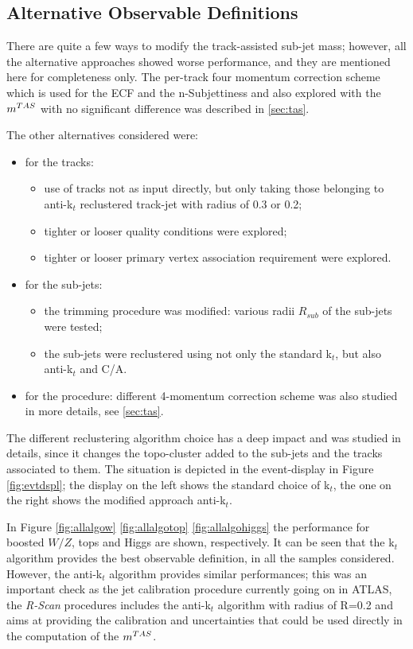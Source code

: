 \subsection{Alternative Observable Definitions}
\label{sec:alternate}

There are quite a few ways to modify the track-assisted sub-jet mass; however, all the alternative approaches showed worse performance, and they are mentioned here for completeness only.
The per-track four momentum correction scheme which is used for the ECF and the n-Subjettiness and also explored with the $m^{TAS}$ with no significant difference was described in \ref{sec:tas}.

The other alternatives considered were: 
\begin{itemize}
 \item for the tracks:
 \begin{itemize}
   \item use of tracks not as input directly, but only taking those belonging to anti-k$_t$ reclustered track-jet with radius of 0.3 or 0.2;
   \item tighter or looser quality conditions were explored;
   \item tighter or looser primary vertex association requirement were explored.
 \end{itemize}
 \item for the sub-jets:
  \begin{itemize}
   \item the trimming procedure was modified: various radii $R_{sub}$ of the sub-jets were tested;
   \item the sub-jets were reclustered using not only the standard k$_t$, but also anti-k$_t$ and C/A.
  \end{itemize}
  \item for the procedure: different 4-momentum correction scheme was also studied in more details, see \ref{sec:tas}.
\end{itemize}

The different reclustering algorithm choice has a deep impact and was studied in details, since it changes the topo-cluster added to the sub-jets and the tracks associated to them. The situation is depicted in the event-display in Figure \ref{fig:evtdspl}; the display on the left shows the standard choice of k$_t$, the one on the right shows the modified approach anti-k$_t$. 

In Figure \ref{fig:allalgow} \ref{fig:allalgotop} \ref{fig:allalgohiggs} the performance for boosted $W/Z$, tops and Higgs are shown, respectively. It can be seen that the k$_t$ algorithm provides the best observable definition, in all the samples considered. However, the anti-k$_t$ algorithm provides similar performances; this was an important check as the jet calibration procedure currently going on in ATLAS, the \textit{R-Scan} procedures includes the anti-k$_t$ algorithm with radius of R=0.2 and aims at providing the calibration and uncertainties that could be used directly in the computation of the $m^{TAS}$.

